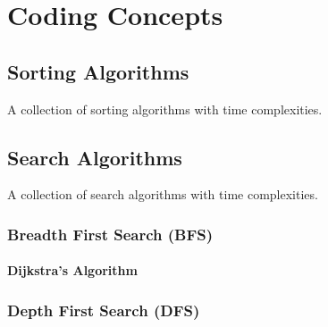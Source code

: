 \chapter{Coding Concepts}
\label{coding}

\section{Sorting Algorithms}
\label{coding:sorts}

\begin{table}[H]
\centering
\begingroup
\renewcommand*{\arraystretch}{1}

\endgroup
\caption{
A collection of sorting algorithms with time complexities.
}
\label{tab:sorting_table}
\end{table}

\section{Search Algorithms}
\label{coding:searchs}

\begin{table}[H]
\centering
\begingroup
\renewcommand*{\arraystretch}{1}

\endgroup
\caption{
A collection of search algorithms with time complexities.
}
\label{tab:search_table}
\end{table}

\subsection{Breadth First Search (BFS)}
\label{coding:other:bfs}

\subsubsection{Dijkstra's Algorithm}
\label{coding:other:bfs:dijkstra}

\subsection{Depth First Search (DFS)}
\label{coding:other:dfs}

